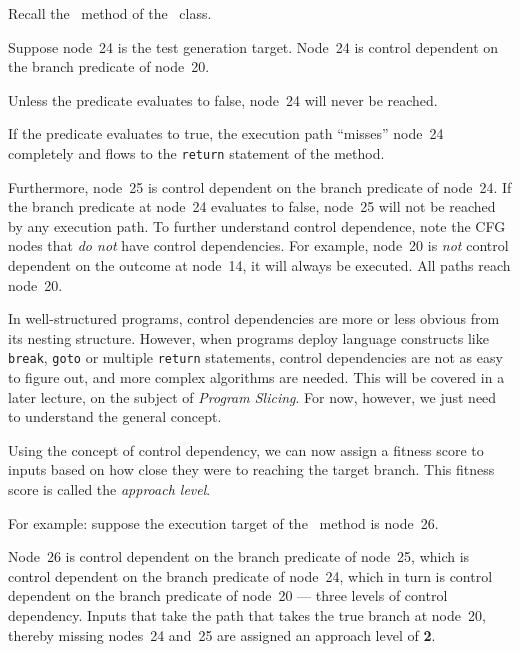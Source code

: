 Recall the \classifymethod~method of the \triangleclass~class. 


Suppose node~24 is the test generation target. Node~24 is control dependent on
the branch predicate of node~20. 


Unless the predicate evaluates to false, node~24 will never be reached. 


If the predicate evaluates to true, the execution path ``misses'' node~24
completely and flows to the {\tt return} statement of the method.


Furthermore, node~25 is control dependent on the branch predicate of node~24. If
the branch predicate at node~24 evaluates to false, node~25 will not be reached
by any execution path. To further understand control dependence, note the CFG
nodes that {\it do not} have control dependencies. For example, node~20 is {\it
not} control dependent on the outcome at node~14, it will always be executed.
All paths reach node~20. 

In well-structured programs, control dependencies are more or less obvious from
its nesting structure. However, when programs deploy language constructs like
{\tt break}, {\tt goto} or multiple {\tt return} statements, control
dependencies are not as easy to figure out, and more complex algorithms are
needed. This will be covered in a later lecture, on the subject of {\it Program
Slicing}. For now, however, we just need to understand the general concept. 

Using the concept of control dependency, we can now assign a fitness score to
inputs based on how close they were to reaching the target branch. This fitness
score is called the {\it approach level}. 


For example: suppose the execution target of the \classifymethod~method is
node~26. 


Node~26 is control dependent on the branch predicate of node~25, which is
control dependent on the branch predicate of node~24, which in turn is control
dependent on the branch predicate of node~20 --- three levels of control
dependency. Inputs that take the path that takes the true branch at node~20,
thereby missing nodes~24 and~25 are assigned an approach level of {\bf 2}. 


